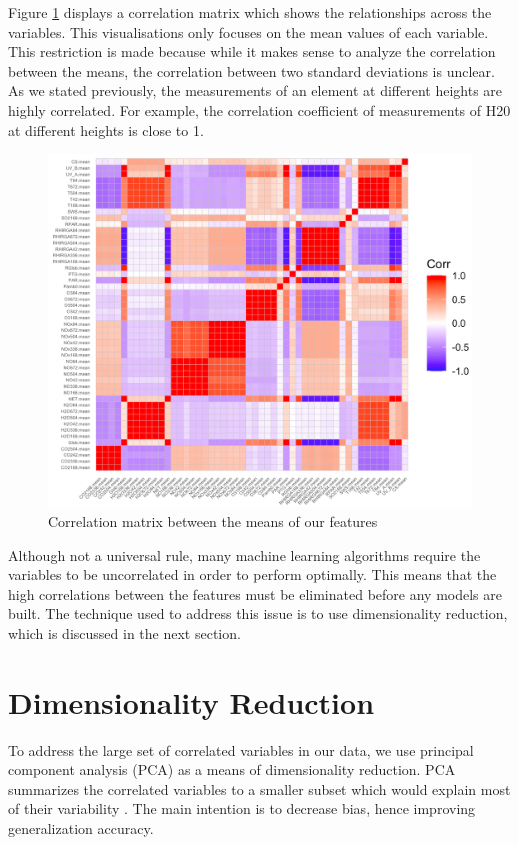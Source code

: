 Figure \ref{fig:correlation_matrix} displays a correlation matrix which shows the relationships across the variables. This visualisations only focuses on the mean values of each variable. This restriction is made because while it makes sense to analyze the correlation between the means, the correlation between two standard deviations is unclear. As we stated previously, the measurements of an element at different heights are highly correlated. For example, the correlation coefficient of measurements of H20 at different heights is close to 1.

\begin{figure}[!ht]
   \centering
   \includegraphics[width=\textwidth]{images/correlation_matrix.png}
   \caption{Correlation matrix between the means of our features}
   \label{fig:correlation_matrix}
\end{figure}

Although not a universal rule, many machine learning algorithms require the variables to be uncorrelated in order to perform optimally. This means that the high correlations between the features must be eliminated before any models are built. The technique used to address this issue is to use dimensionality reduction, which is discussed in the next section.

\section{Dimensionality Reduction}

To address the large set of correlated variables in our data, we use principal component analysis (PCA) as a means of dimensionality reduction. PCA summarizes the correlated variables to a smaller subset which would explain most of their variability \cite{intro_stat_learning}. The main intention is to decrease bias, hence improving generalization accuracy.

